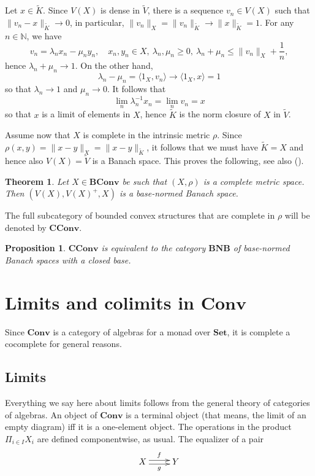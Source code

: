 \documentclass[12pt,letterpaper]{article}
\newtheorem{theorem}[lemma]{Theorem}
\newtheorem{proposition}[lemma]{Proposition}
\newcommand{\ct}[1]{\mathbf{#1}}
\newcommand{\<}{\langle}
\def\>{\rangle}
\begin{document}
Let $x\in \tilde K$. Since $V(X)$ is dense in $\tilde V$, there is a sequence $v_n\in V(X)$ such that $\|v_n-x\|_{\tilde K}\to 0$, 
in particular, $\|v_n\|_X=\|v_n\|_{\tilde K}\to \|x\|_{\tilde K}=1$. For any $n\in \mathbb N$, we have
\[
v_n=\lambda_n x_n-\mu_n y_n,\quad x_n,y_n\in X,\ \lambda_n,\mu_n\ge 0,\ \lambda_n+\mu_n\le \|v_n\|_X+\frac1n,
\]
hence $\lambda_n+\mu_n\to 1$. On the other hand, 
\[
\lambda_n-\mu_n=\<1_X,v_n\>\to \<1_X,x\>=1
\]
so that $\lambda_n\to 1$ and $\mu_n\to 0$. It follows that
\[
\lim_n \lambda_n^{-1}x_n=\lim_n v_n =x
\]
so that $x$ is a limit of elements in $X$, hence  $\tilde K$ is the norm closure of $X$ in $\tilde V$. 


Assume now that $X$ is complete in the intrinsic metric $\rho$. Since $\rho(x,y)=\|x-y\|_X=\|x-y\|_{\tilde K}$, it follows that we must have $\tilde K=X$ and hence also $V(X)=\tilde V$ is a Banach space.
This proves the following, see also \cite{G} (\cite[Thm. 2.7]{convex}). 

\begin{theorem}
Let $X\in \ct{BConv}$ be such that $(X,\rho)$ is a complete metric space. Then $(V(X), V(X)^+, X)$ is a base-normed Banach space.
\end{theorem}

The full subcategory of bounded convex structures that are complete in $\rho$ will be denoted by $\ct{CConv}$. 

\begin{proposition} $\ct{CConv}$ is equivalent to the category $\ct{BNB}$ of base-normed Banach spaces with a closed base.

\end{proposition}

\section{Limits and colimits in $\ct{Conv}$}

Since $\ct{Conv}$ is a category of algebras for a monad over $\ct{Set}$, it is complete a
cocomplete for general reasons. 

\subsection{Limits}

Everything we say here about limits follows from the general theory of categories of algebras.
An object of $\ct{Conv}$ is a terminal object (that means, the limit of an empty diagram)
iff it is a one-element object. The operations in the product $\Pi_{i\in I}X_i$ are defined
componentwise, as usual. The equalizer of a pair
\begin{equation}
\label{eq:parallel}
\xymatrix{
X
	\ar@<-.5ex>[r]_{g}
	\ar@<.5ex>[r]^{f}
&
Y
}
\end{equation}
\end{document}

